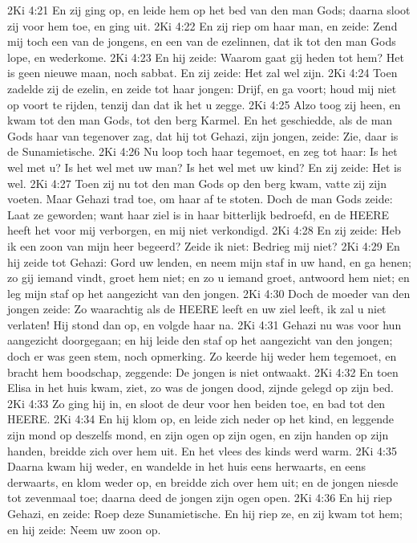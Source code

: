2Ki 4:21  En zij ging op, en leide hem op het bed van den man Gods; daarna sloot zij voor hem toe, en ging uit.
2Ki 4:22  En zij riep om haar man, en zeide: Zend mij toch een van de jongens, en een van de ezelinnen, dat ik tot den man Gods lope, en wederkome.
2Ki 4:23  En hij zeide: Waarom gaat gij heden tot hem? Het is geen nieuwe maan, noch sabbat. En zij zeide: Het zal wel zijn.
2Ki 4:24  Toen zadelde zij de ezelin, en zeide tot haar jongen: Drijf, en ga voort; houd mij niet op voort te rijden, tenzij dan dat ik het u zegge.
2Ki 4:25  Alzo toog zij heen, en kwam tot den man Gods, tot den berg Karmel. En het geschiedde, als de man Gods haar van tegenover zag, dat hij tot Gehazi, zijn jongen, zeide: Zie, daar is de Sunamietische.
2Ki 4:26  Nu loop toch haar tegemoet, en zeg tot haar: Is het wel met u? Is het wel met uw man? Is het wel met uw kind? En zij zeide: Het is wel.
2Ki 4:27  Toen zij nu tot den man Gods op den berg kwam, vatte zij zijn voeten. Maar Gehazi trad toe, om haar af te stoten. Doch de man Gods zeide: Laat ze geworden; want haar ziel is in haar bitterlijk bedroefd, en de HEERE heeft het voor mij verborgen, en mij niet verkondigd.
2Ki 4:28  En zij zeide: Heb ik een zoon van mijn heer begeerd? Zeide ik niet: Bedrieg mij niet?
2Ki 4:29  En hij zeide tot Gehazi: Gord uw lenden, en neem mijn staf in uw hand, en ga henen; zo gij iemand vindt, groet hem niet; en zo u iemand groet, antwoord hem niet; en leg mijn staf op het aangezicht van den jongen.
2Ki 4:30  Doch de moeder van den jongen zeide: Zo waarachtig als de HEERE leeft en uw ziel leeft, ik zal u niet verlaten! Hij stond dan op, en volgde haar na.
2Ki 4:31  Gehazi nu was voor hun aangezicht doorgegaan; en hij leide den staf op het aangezicht van den jongen; doch er was geen stem, noch opmerking. Zo keerde hij weder hem tegemoet, en bracht hem boodschap, zeggende: De jongen is niet ontwaakt.
2Ki 4:32  En toen Elisa in het huis kwam, ziet, zo was de jongen dood, zijnde gelegd op zijn bed.
2Ki 4:33  Zo ging hij in, en sloot de deur voor hen beiden toe, en bad tot den HEERE.
2Ki 4:34  En hij klom op, en leide zich neder op het kind, en leggende zijn mond op deszelfs mond, en zijn ogen op zijn ogen, en zijn handen op zijn handen, breidde zich over hem uit. En het vlees des kinds werd warm.
2Ki 4:35  Daarna kwam hij weder, en wandelde in het huis eens herwaarts, en eens derwaarts, en klom weder op, en breidde zich over hem uit; en de jongen niesde tot zevenmaal toe; daarna deed de jongen zijn ogen open.
2Ki 4:36  En hij riep Gehazi, en zeide: Roep deze Sunamietische. En hij riep ze, en zij kwam tot hem; en hij zeide: Neem uw zoon op.
